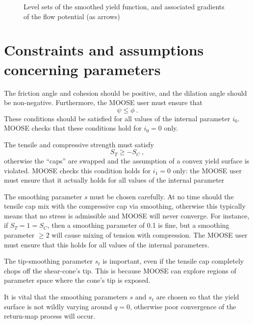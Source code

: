 \documentclass[]{scrreprt}
\begin{document}
\begin{figure}[htb]
\begin{center}
\caption{Level sets of the smoothed yield function, and associated
  gradients of the flow potential (as arrows)}
\label{smoothed_entire.fig}
\end{center}
\end{figure}





\chapter{Constraints and assumptions concerning parameters}

The friction angle and cohesion should be positive, and the dilation
angle should be non-negative.  Furthermore, the MOOSE user must ensure that
\begin{equation}
\psi \leq \phi \ .
\end{equation}
These conditions should be satisfied for all values of the internal
parameter $i_{0}$.  MOOSE checks that these conditions hold for
$i_{0}=0$ only.

The tensile and compressive strength must satisfy
\begin{equation}
S_{T} \geq -S_{C} \ ,
\end{equation}
otherwise the ``caps'' are swapped and the assumption of a convex
yield surface is violated.  MOOSE checks this condition holds for
$i_{1}=0$ only: the MOOSE user must ensure that it actually holds for
all values of the internal parameter

The smoothing parameter $s$ must be chosen carefully.  At no time should
the tensile cap mix with the compressive cap via smoothing, otherwise
this typically means that no stress is admissible and MOOSE will never
converge.  For instance, if $S_{T}=1=S_{C}$, then a smoothing
parameter of 0.1 is fine, but a smoothing parameter $\geq 2$ will
cause mixing of tension with compression.  The MOOSE user must ensure
that this holds for all values of the internal parameters.

The tip-smoothing parameter $s_{t}$ is important, even if the tensile cap
completely chops off the shear-cone's tip.  This is because MOOSE can
explore regions of parameter space where the cone's tip is exposed.

It is vital that the smoothing parameters $s$ and $s_{t}$ are chosen so
that the yield surface is not wildly varying around $q=0$, otherwise
poor convergence of the return-map process will occur.
\end{document}
